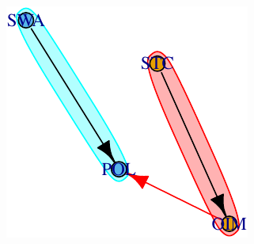 \documentclass[
]{jss}
\begin{document}
\begin{CodeChunk}


\begin{center}\includegraphics{netmap_oim_files/figure-latex/unnamed-chunk-4-1} \end{center}

\end{CodeChunk}
\end{document}
